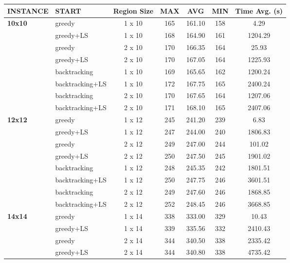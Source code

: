 \documentclass[preprint,12pt]{elsarticle}
\begin{document}
\begin{table}[h]
\scriptsize
	\centering
		\begin{tabular}{| l l | c c c c c |}
		\hline %
\textbf{INSTANCE}	 & 	\textbf{START}	 & 	\textbf{Region Size}	 & 	\textbf{MAX}	 & 	\textbf{AVG}	 & 	\textbf{MIN}	 & 	\textbf{Time Avg. (s)}	\\\hline \hline
\textbf{10x10}	 & 	greedy	 & 	1 x 10	 & 	165	 & 	161.10	 & 	158	 & 	4.29	\\
	 & 	greedy+LS	 & 	1 x 10	 & 	168	 & 	164.90	 & 	161	 & 	1204.29	\\
	 & 	greedy	 & 	2 x 10	 & 	170	 & 	166.35	 & 	164	 & 	25.93	\\
	 & 	greedy+LS	 & 	2 x 10	 & 	170	 & 	167.05	 & 	164	 & 	1225.93	\\
	 & 	backtracking	 & 	1 x 10	 & 	169	 & 	165.65	 & 	162	 & 	1200.24	\\
	 & 	backtracking+LS	 & 	1 x 10	 & 	172	 & 	167.75	 & 	165	 & 	2400.24	\\
	 & 	backtracking	 & 	2 x 10	 & 	170	 & 	167.65	 & 	164	 & 	1207.06	\\
	 & 	backtracking+LS	 & 	2 x 10	 & 	171	 & 	168.10	 & 	165	 & 	2407.06	\\\hline
\textbf{12x12}	 & 	greedy	 & 	1 x 12	 & 	245	 & 	241.20	 & 	239	 & 	6.83	\\
	 & 	greedy+LS	 & 	1 x 12	 & 	247	 & 	244.00	 & 	240	 & 	1806.83	\\
	 & 	greedy	 & 	2 x 12	 & 	249	 & 	247.00	 & 	244	 & 	101.02	\\
	 & 	greedy+LS	 & 	2 x 12	 & 	250	 & 	247.50	 & 	245	 & 	1901.02	\\
	 & 	backtracking	 & 	1 x 12	 & 	248	 & 	245.35	 & 	242	 & 	1801.51	\\
	 & 	backtracking+LS	 & 	1 x 12	 & 	250	 & 	247.75	 & 	246	 & 	3601.51	\\
	 & 	backtracking	 & 	2 x 12	 & 	249	 & 	247.60	 & 	246	 & 	1868.85	\\
	 & 	backtracking+LS	 & 	2 x 12	 & 	252	 & 	248.45	 & 	246	 & 	3668.85	\\\hline
\textbf{14x14	} & 	greedy	 & 	1 x 14	 & 	338	 & 	333.00	 & 	329	 & 	10.43	\\
	 & 	greedy+LS	 & 	1 x 14	 & 	339	 & 	335.56	 & 	332	 & 	2410.43	\\
	 & 	greedy	 & 	2 x 14	 & 	344	 & 	340.50	 & 	338	 & 	2335.42	\\
	 & 	greedy+LS	 & 	2 x 14	 & 	344	 & 	340.80	 & 	338	 & 	4735.42	\\

\end{tabular}
\end{table}
\end{document}
